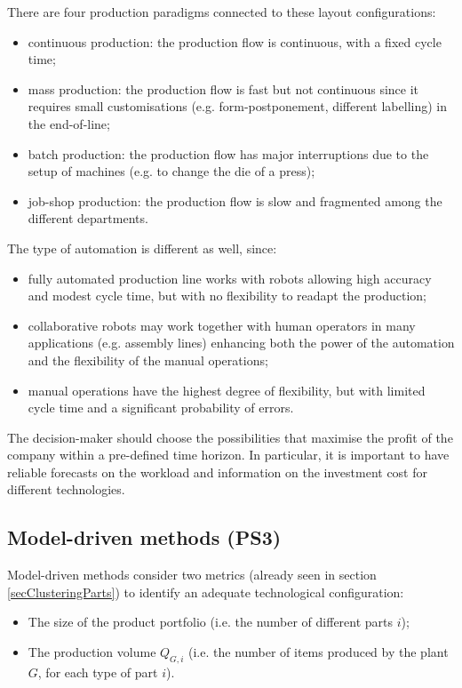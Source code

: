 There are four production paradigms connected to these layout configurations:

\begin{itemize}
    \item continuous production: the production flow is continuous, with a fixed cycle time;
    \item mass production: the production flow is fast but not continuous since it requires small customisations (e.g. form-postponement, different labelling) in the end-of-line;
    \item batch production: the production flow has major interruptions due to the setup of machines (e.g. to change the die of a press);
    \item job-shop production: the production flow is slow and fragmented among the different departments.

\end{itemize}

The type of automation is different as well, since:

\begin{itemize}
    \item fully automated production line works with robots allowing high accuracy and modest cycle time, but with no flexibility to readapt the production;
    \item collaborative robots may work together with human operators in many applications (e.g. assembly lines) enhancing both the power of the automation and the flexibility of the manual operations;
    \item manual operations have the highest degree of flexibility, but with limited cycle time and a significant probability of errors.

\end{itemize}

The decision-maker should choose the possibilities that maximise the profit of the company within a pre-defined time horizon. In particular, it is important to have reliable forecasts on the workload and information on the investment cost for different technologies.

\subsection{Model-driven methods (PS3)}
Model-driven methods consider two metrics (already seen in section \ref{secClusteringParts}) to identify an adequate technological configuration:

\begin{itemize}
    \item The size of the product portfolio (i.e. the number of different parts $i$);
	\item The production volume $Q_{G,i}$ (i.e. the number of items produced by the plant $G$, for each type of part $i$).

\end{itemize}

